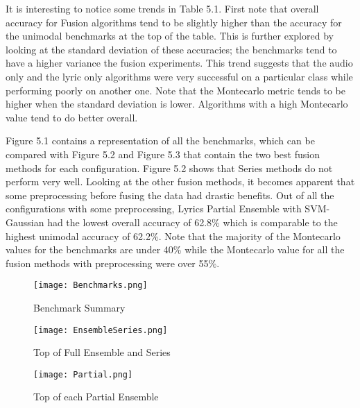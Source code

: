It is interesting to notice some trends in Table 5.1. First note that overall accuracy for Fusion 
algorithms tend to be slightly higher than the accuracy for the unimodal benchmarks at the 
top of the table.  This is further explored by looking at the standard deviation of these 
accuracies; the benchmarks tend to have a higher variance the fusion experiments. This trend 
suggests that the audio only and the lyric only algorithms were very successful on a particular 
class while performing poorly on another one. Note that the Montecarlo metric tends to be higher
 when the standard deviation is lower.  Algorithms with a high Montecarlo value tend to do better
  overall.


Figure 5.1 contains a representation of all the benchmarks, which can be compared with Figure 5.2 
and Figure 5.3 that contain the two best fusion methods for each configuration. Figure 5.2 shows that 
Series methods do not perform very well. Looking at the other fusion methods, it becomes apparent that some preprocessing before fusing the data had drastic benefits.   Out of all the configurations with some preprocessing, 
Lyrics Partial Ensemble with SVM-Gaussian had the lowest overall accuracy of 62.8\% which is comparable
to the highest unimodal accuracy of 62.2\%.   Note that the majority of the Montecarlo values for 
the benchmarks are under 40\% while the Montecarlo value for all the fusion methods with preprocessing were over 55\%. 

\begin{figure}
\begin{minipage}[b]{\linewidth}
  \centering
  \texttt{[image: Benchmarks.png]}
  \caption{\small{Benchmark Summary}}
  \label{fig:blah1}
\end{minipage}
\hfill


\begin{minipage}[b]{0.6\linewidth}
  \centering
  \hspace*{-0.7in}
  \texttt{[image: EnsembleSeries.png]}
  \caption{\small{Top of Full Ensemble and Series}}
  \label{fig:blah1}
\end{minipage}
\hfill
\begin{minipage}[b]{0.6\linewidth}
  \centering
      \hspace*{-.3in}
  \texttt{[image: Partial.png]}
  \caption{\small{Top of each Partial Ensemble}}
  \label{fig:blah2}
\end{minipage}
\end{figure}

